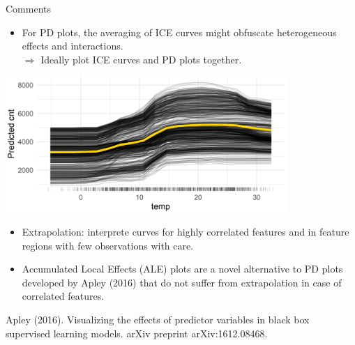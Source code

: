 \begin{vbframe}{Comments}
\begin{itemize}
  \item For PD plots, the averaging of ICE curves might obfuscate heterogeneous effects and interactions. \\
  $\Rightarrow$ Ideally plot ICE curves and PD plots together.
\end{itemize}
 \vspace{-0.3cm}


\begin{center}
\includegraphics[width=0.8\textwidth]{figure_man/comments.png}
\end{center}

\vspace{-0.5cm}
\framebreak

\begin{itemize}
\lz
\item Extrapolation: interprete curves for highly correlated features and in feature regions with few observations with care.
\lz
\item Accumulated Local Effects (ALE) plots are a novel alternative to PD plots developed by Apley (2016) that do not suffer from extrapolation in case of correlated features.
\end{itemize}

\vspace{2cm}
\vfill\tiny
Apley (2016).
Visualizing the effects of predictor variables in black box supervised learning models.
arXiv preprint arXiv:1612.08468.

\end{vbframe}


\endlecture

